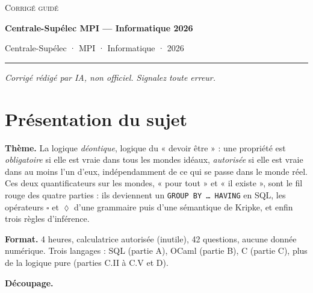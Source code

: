 \documentclass[11pt,a4paper]{article}
\providecommand{\Box}{\square}
\providecommand{\Diamond}{\lozenge}
\begin{document}
\thispagestyle{plain}
\begin{center}
  {\small\scshape Corrigé guidé}\par\smallskip
  {\LARGE\bfseries Centrale-Supélec MPI — Informatique 2026\par}\medskip
  {\large Centrale-Supélec · MPI · Informatique · 2026\par}
\end{center}
\vspace{2pt}\hrule\vspace{8pt}

\emph{Corrigé rédigé par IA, non officiel. Signalez toute erreur.}

\hypertarget{pruxe9sentation-du-sujet}{%
\section{Présentation du sujet}\label{pruxe9sentation-du-sujet}}

\textbf{Thème.} La logique \emph{déontique}, logique du « devoir être » : une propriété est \emph{obligatoire} si elle est vraie dans tous les mondes idéaux, \emph{autorisée} si elle est vraie dans au moins l'un d'eux, indépendamment de ce qui se passe dans le monde réel. Ces deux quantificateurs sur les mondes, « pour tout » et « il existe », sont le fil rouge des quatre parties : ils deviennent un \texttt{GROUP\ BY\ …\ HAVING} en SQL, les opérateurs \(\Box\) et \(\Diamond\) d'une grammaire puis d'une sémantique de Kripke, et enfin trois règles d'inférence.

\textbf{Format.} 4 heures, calculatrice autorisée (inutile), 42 questions, aucune donnée numérique. Trois langages : SQL (partie A), OCaml (partie B), C (partie C), plus de la logique pure (parties C.II à C.V et D).

\textbf{Découpage.}
\end{document}
